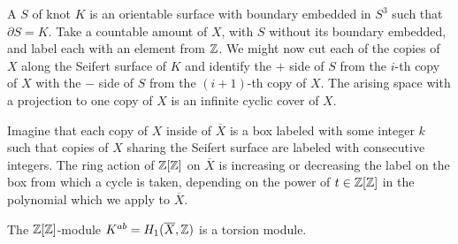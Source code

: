 A  $S$ of knot $K$ is an orientable surface with boundary embedded in $S^3$ such that $\partial S=K$. Take a countable amount of $X$, with $S$ without its boundary embedded, and label each with an element from $\operatorname{\mathbb{Z}}$. We might now cut each of the copies of $X$ along the Seifert surface of $K$ and identify the $+$ side of $S$ from the $i$-th copy of $X$ with the $-$ side of $S$ from the $(i+1)$-th copy of $X$. The arising space with a projection to one copy of $X$ is an infinite cyclic cover of $X$.

Imagine that each copy of $X$ inside of $\overline{X}$ is a box labeled with some integer $k$ such that copies of $X$ sharing the Seifert surface are labeled with consecutive integers. The ring action of $\operatorname{\mathbb{Z}}[\operatorname{\mathbb{Z}}]$ on $\overline{X}$ is increasing or decreasing the label on the box from which a cycle is taken, depending on the power of $t\in\operatorname{\mathbb{Z}}[\operatorname{\mathbb{Z}}]$ in the polynomial which we apply to $\overline{X}$.

\begin{proposition}\label{prop: modul alexandera jest torsyjny}
  The $\operatorname{\mathbb{Z}}[\operatorname{\mathbb{Z}}]$-module $K^{ab}=H_1(\overline{X}, \operatorname{\mathbb{Z}})$ is a torsion module.
\end{proposition}

